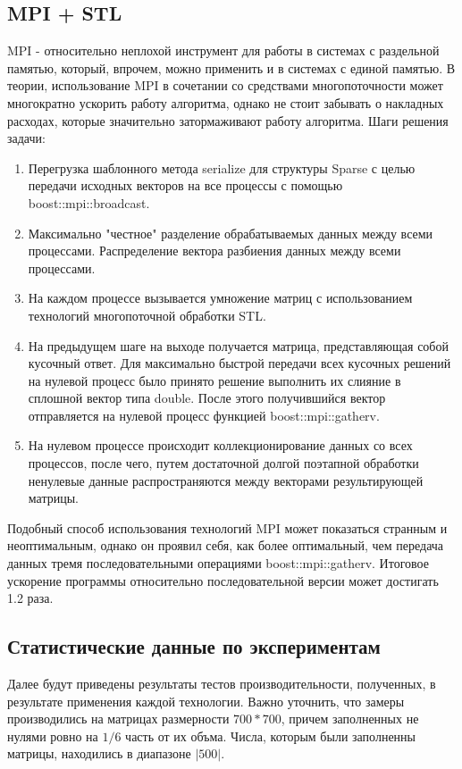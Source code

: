 \documentclass[12pt]{article}
\begin{document}
\subsection*{MPI + STL}
MPI - относительно неплохой инструмент для работы в системах с раздельной памятью, который, впрочем, можно применить и в системах с единой памятью. В теории, использование MPI в сочетании со средствами многопоточности может многократно ускорить работу алгоритма, однако не стоит забывать о накладных расходах, которые значительно затормаживают работу алгоритма. Шаги решения задачи:
\begin{enumerate}
    \item Перегрузка шаблонного метода serialize для структуры Sparse с целью передачи исходных векторов на все процессы с помощью boost::mpi::broadcast.
    \item Максимально "честное" разделение обрабатываемых данных между всеми процессами. Распределение вектора разбиения данных между всеми процессами.
    \item На каждом процессе вызывается умножение матриц с использованием технологий многопоточной обработки STL.
    \item На предыдущем шаге на выходе получается матрица, представляющая собой кусочный ответ. Для максимально быстрой передачи всех кусочных решений на нулевой процесс было принято решение выполнить их слияние в сплошной вектор типа double. После этого получившийся вектор отправляется на нулевой процесс функцией boost::mpi::gatherv.
    \item На нулевом процессе происходит коллекционирование данных со всех процессов, после чего, путем достаточной долгой поэтапной обработки ненулевые данные распространяются между векторами результирующей матрицы.
\end{enumerate}
Подобный способ использования технологий MPI может показаться странным и неоптимальным, однако он проявил себя, как более оптимальный, чем передача данных тремя последовательными операциями boost::mpi::gatherv. Итоговое ускорение программы относительно последовательной версии может достигать 1.2 раза.\newpage
\begin{center}
    \section*{Статистические данные по экспериментам}
\end{center}
Далее будут приведены результаты тестов производительности, полученных, в результате применения каждой технологии. Важно уточнить, что замеры производились на матрицах размерности $700*700$, причем заполненных не нулями ровно на $1/6$ часть от их объма. Числа, которым были заполненны матрицы, находились в диапазоне $|500|$. 
\end{document}
